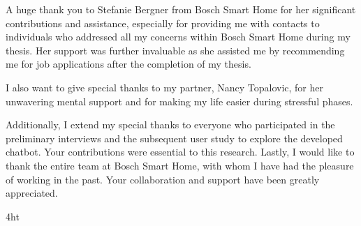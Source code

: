 \documentclass[
  a4paper,  %
  twoside,  %
  bibliography=totoc,
  headsepline,
  cleardoublepage=empty,
  parskip=half,
  draft=false
]{scrbook}
\begin{document}
A huge thank you to Stefanie Bergner from Bosch Smart Home for her significant contributions and assistance, especially for providing me with contacts to individuals who addressed all my concerns within Bosch Smart Home during my thesis. Her support was further invaluable as she assisted me by recommending me for job applications after the completion of my thesis.

I also want to give special thanks to my partner, Nancy Topalovic, for her unwavering mental support and for making my life easier during stressful phases.

Additionally, I extend my special thanks to everyone who participated in the preliminary interviews and the subsequent user study to explore the developed chatbot. Your contributions were essential to this research. Lastly, I would like to thank the entire team at Bosch Smart Home, with whom I have had the pleasure of working in the past. Your collaboration and support have been greatly appreciated.
\cleardoublepage

\iftex4ht
\else
\fi

%
%

%
%
%
\tableofcontents


\listoffigures
\listoftables

\ifdeutsch
\else
\fi

\end{document}
